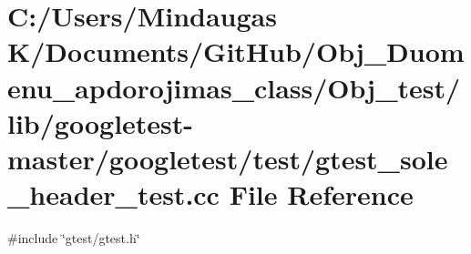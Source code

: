 \hypertarget{_obj__test_2lib_2googletest-master_2googletest_2test_2gtest__sole__header__test_8cc}{}\section{C\+:/\+Users/\+Mindaugas K/\+Documents/\+Git\+Hub/\+Obj\+\_\+\+Duomenu\+\_\+apdorojimas\+\_\+class/\+Obj\+\_\+test/lib/googletest-\/master/googletest/test/gtest\+\_\+sole\+\_\+header\+\_\+test.cc File Reference}
\label{_obj__test_2lib_2googletest-master_2googletest_2test_2gtest__sole__header__test_8cc}
{\ttfamily \#include \char`\"{}gtest/gtest.\+h\char`\"{}}\newline
